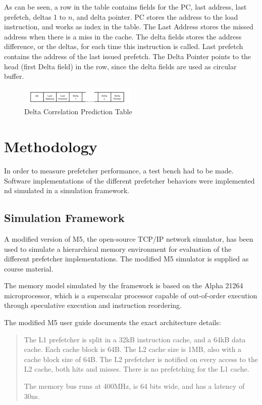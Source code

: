\documentclass[a4paper]{IEEEtran}
\begin{document}
As can be seen, a row in the table contains fields for the PC, last address, last prefetch, deltas 1 to $ n $, and delta pointer.
PC stores the address to the load instruction, and works as index in the table.
The Last Address stores the missed address when there is a miss in the cache.
The delta fields stores the address difference, or the deltas, for each time this instruction is called.
Last prefetch contains the address of the last issued prefetch.
The Delta Pointer points to the head (first Delta field) in the row, since the delta fields are used as circular buffer.

\begin{figure}[h!]
  \centering
      \includegraphics[width=0.5\textwidth]{Figures/DCTable}
  \caption{Delta Correlation Prediction Table}
  \label{fig:DCTable}
\end{figure}

\section{Methodology}

In order to measure prefetcher performance, a test bench had to be made.
Software implementations of the different prefetcher behaviors were implemented nd simulated in a simulation framework.

\subsection{Simulation Framework}

A modified version of M5, the open-source TCP/IP network simulator\cite{M5paper}, has been used to simulate a hierarchical memory environment for evaluation of the different prefetcher implementations.
The modified M5 simulator is supplied as course material.

The memory model simulated by the framework is based on the Alpha 21264 microprocessor, which is a superscalar processor capable of out-of-order execution through speculative execution and instruction reordering.

The modified M5 user guide documents the exact architecture details:

\begin{quote}
The L1 prefetcher is split in a 32kB instruction cache, and a 64kB data cache.
Each cache block is 64B.
The L2 cache size is 1MB, also with a cache block size of 64B.
The L2 prefetcher is notified on every access to the L2 cache, both hits and misses.
There is no prefetching for the L1 cache.

The memory bus runs at 400MHz, is 64 bits wide, and has a latency of 30ns.~\cite{m5userguide}
\end{quote}
\end{document}

